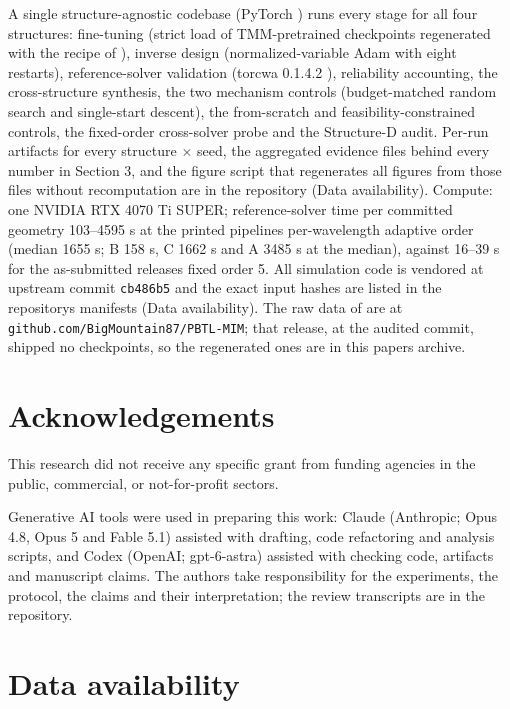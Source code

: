 \documentclass[11pt,a4paper]{article}
\begin{document}
A single structure-agnostic codebase (PyTorch \cite{al201957}) runs every stage for all four structures:
fine-tuning (strict load of TMM-pretrained checkpoints regenerated with the recipe of \cite{choi20261}), inverse
design (normalized-variable Adam with eight restarts), reference-solver
validation (torcwa 0.1.4.2 \cite{kim202346}), reliability accounting, the cross-structure
synthesis, the two mechanism controls (budget-matched random search and
single-start descent), the from-scratch and feasibility-constrained controls, the
fixed-order cross-solver probe and the Structure-D audit. Per-run artifacts for every structure \ensuremath{\times} seed, the
aggregated evidence files behind every number in Section 3, and the figure
script that regenerates all figures from those files without recomputation are
in the repository (Data availability). Compute: one NVIDIA RTX 4070 Ti
SUPER; reference-solver time per committed geometry 103--4595 s at the printed
pipeline\textquotesingle s per-wavelength adaptive order (median 1655 s; B 158 s, C 1662 s and A 3485 s
at the median), against 16--39 s for the as-submitted release\textquotesingle s fixed order 5. All
simulation code is vendored at upstream commit \texttt{cb486b5} and the exact
input hashes are listed in the repository\textquotesingle s manifests (Data availability). The raw data of \cite{choi20261}
are at \texttt{github.\allowbreak{}com/\allowbreak{}BigMountain87/\allowbreak{}PBTL-\allowbreak{}MIM}; that release, at the audited commit, shipped no checkpoints, so the
regenerated ones are in this paper\textquotesingle s archive.

\section*{Acknowledgements}

This research did not receive any specific grant from funding agencies in the public,
commercial, or not-for-profit sectors.

Generative AI tools were used in preparing this work: Claude (Anthropic; Opus 4.8, Opus 5
and Fable 5.1) assisted with drafting, code refactoring and analysis scripts, and Codex
(OpenAI; gpt-6-astra) assisted with checking code, artifacts and manuscript claims. The
authors take responsibility for the experiments, the protocol, the claims and their
interpretation; the review transcripts are in the repository.

\section*{Data availability}
\end{document}
